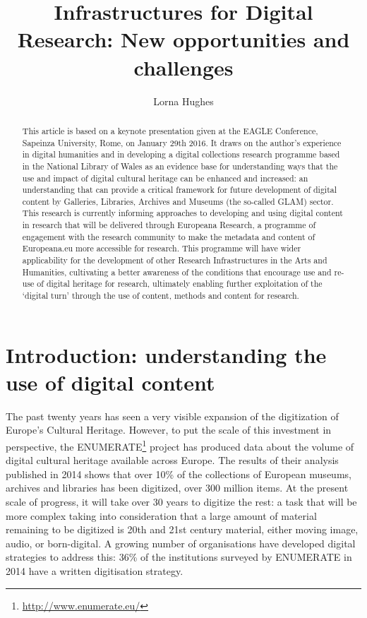 \documentclass[amsthm,ebook]{saparticle}
\title{Infrastructures for Digital Research: New opportunities and challenges}
\author[gla]{Lorna Hughes\corref{first}}
\begin{document}
\maketitle
\begin{abstract}
This article is based on a keynote presentation given at the EAGLE Conference, Sapeinza University, Rome, on January 29th 2016. It draws on the author’s experience in digital humanities and in developing a digital collections research programme based in the National Library of Wales as an evidence base for understanding ways that the use and impact of digital cultural heritage can be enhanced and increased: an understanding that can provide a critical framework for future development of digital content by Galleries, Libraries, Archives and Museums (the so-called GLAM) sector.  This research is currently informing approaches to developing and using digital content in research that will be delivered through Europeana Research, a programme of engagement with the research community to make the metadata and content of Europeana.eu more accessible for research. This programme will have wider applicability for the development of other Research Infrastructures in the Arts and Humanities, cultivating a better awareness of the conditions that encourage use and re-use of digital heritage for research, ultimately enabling further exploitation of the ‘digital turn’ through the use of content, methods and content for research.
\end{abstract}

\section{Introduction: understanding the use of digital content}

The past twenty years has seen a very visible expansion of the digitization of Europe’s Cultural Heritage. However, to put the scale of this investment in perspective, the ENUMERATE\footnote{\url{http://www.enumerate.eu/}} project has produced data about the volume of digital cultural heritage available across Europe. The results of their analysis published in 2014 \cite[6]{ENUMERATE:2014aa} shows that over 10\% of the collections of European museums, archives and libraries has been digitized, over 300 million items. At the present scale of progress, it will take over 30 years to digitize the rest: a task that will be more complex taking into consideration that a large amount of material remaining to be digitized is 20th and 21st century material, either moving image, audio, or born-digital. A growing number of organisations have developed digital strategies to address this: 36\% of the institutions surveyed by ENUMERATE in 2014 have a written digitisation strategy. 
\end{document}
